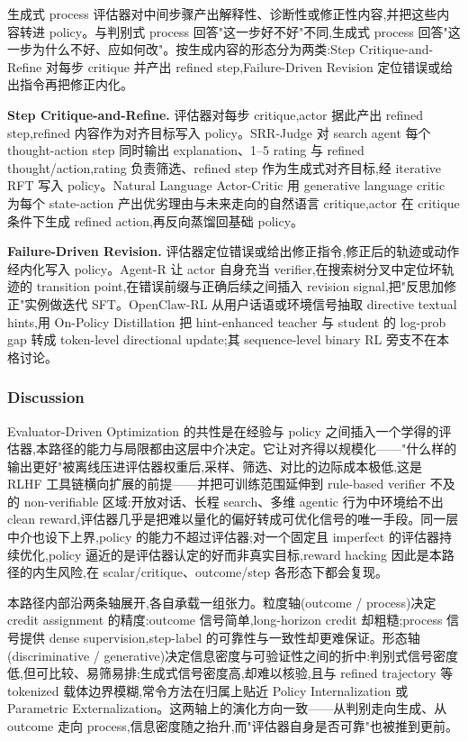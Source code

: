 生成式 process 评估器对中间步骤产出解释性、诊断性或修正性内容,并把这些内容转进 policy。与判别式 process 回答"这一步好不好"不同,生成式 process 回答"这一步为什么不好、应如何改"。按生成内容的形态分为两类:Step Critique-and-Refine 对每步 critique 并产出 refined step,Failure-Driven Revision 定位错误或给出指令再把修正内化。

\textbf{Step Critique-and-Refine.} 评估器对每步 critique,actor 据此产出 refined step,refined 内容作为对齐目标写入 policy。SRR-Judge \cite{Zha26am} 对 search agent 每个 thought-action step 同时输出 explanation、1–5 rating 与 refined thought/action,rating 负责筛选、refined step 作为生成式对齐目标,经 iterative RFT 写入 policy。Natural Language Actor-Critic \cite{Hon25c} 用 generative language critic 为每个 state-action 产出优劣理由与未来走向的自然语言 critique,actor 在 critique 条件下生成 refined action,再反向蒸馏回基础 policy。

\textbf{Failure-Driven Revision.} 评估器定位错误或给出修正指令,修正后的轨迹或动作经内化写入 policy。Agent-R \cite{Yua25c} 让 actor 自身充当 verifier,在搜索树分叉中定位坏轨迹的 transition point,在错误前缀与正确后续之间插入 revision signal,把"反思加修正"实例做迭代 SFT。OpenClaw-RL \cite{Wan26ad} 从用户话语或环境信号抽取 directive textual hints,用 On-Policy Distillation 把 hint-enhanced teacher 与 student 的 log-prob gap 转成 token-level directional update;其 sequence-level binary RL 旁支不在本格讨论。



\subsubsection{Discussion}

Evaluator-Driven Optimization 的共性是在经验与 policy 之间插入一个学得的评估器,本路径的能力与局限都由这层中介决定。它让对齐得以规模化——"什么样的输出更好"被离线压进评估器权重后,采样、筛选、对比的边际成本极低,这是 RLHF 工具链横向扩展的前提——并把可训练范围延伸到 rule-based verifier 不及的 non-verifiable 区域:开放对话、长程 search、多维 agentic 行为中环境给不出 clean reward,评估器几乎是把难以量化的偏好转成可优化信号的唯一手段。同一层中介也设下上界,policy 的能力不超过评估器;对一个固定且 imperfect 的评估器持续优化,policy 逼近的是评估器认定的好而非真实目标,reward hacking 因此是本路径的内生风险,在 scalar/critique、outcome/step 各形态下都会复现。

本路径内部沿两条轴展开,各自承载一组张力。粒度轴(outcome / process)决定 credit assignment 的精度:outcome 信号简单,long-horizon credit 却粗糙;process 信号提供 dense supervision,step-label 的可靠性与一致性却更难保证。形态轴(discriminative / generative)决定信息密度与可验证性之间的折中:判别式信号密度低,但可比较、易筛易排;生成式信号密度高,却难以核验,且与 refined trajectory 等 tokenized 载体边界模糊,常令方法在归属上贴近 Policy Internalization 或 Parametric Externalization。这两轴上的演化方向一致——从判别走向生成、从 outcome 走向 process,信息密度随之抬升,而"评估器自身是否可靠"也被推到更前。

